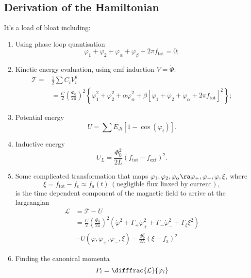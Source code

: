  \subsection{Derivation of the Hamiltonian}
  It's a load of bloat including:
  \begin{enumerate}
  	\item Using phase loop quantisation
  	\begin{equation}\label{key}
  		\varphi_1 + \varphi_2 + \varphi_\alpha + \varphi_\beta + 2\pi f_\text{tot} = 0;
  	\end{equation}
  	\item Kinetic energy evaluation, using emf induction $ V = \dot{\Phi} $:
  	\begin{equation}\label{key}
  		\begin{aligned}
	  		\mathcal{T} = & \frac{1}{2}\sum C_iV_i^2\\
	  		& = \frac{C}{2}\left(\frac{\Phi_0}{2\pi}\right)^2\left\lbrace\dot{\varphi}^2_1 + \dot{\varphi}^2_2 + \alpha\dot{\varphi}^2_\alpha + \beta\left[\dot{\varphi}_1 + \dot{\varphi}_2 + \dot{\varphi}_\alpha + 2\pi \dot{f}_\text{tot}\right]^2\right\rbrace;
  		\end{aligned}
  	\end{equation}
  	\item Potential energy 
  	\begin{equation}\label{key}
  		U = \sum E_{Ji}\left[1 - \cos(\varphi_i)\right].
  	\end{equation}
  	\item Inductive energy
  	\begin{equation}\label{key}
  		U_L = \frac{\Phi_0^2}{2L}\left(f_\text{tot} - f_\text{ext}\right)^2.
  	\end{equation}
  	\item Some complicated transformation that maps $ \varphi_1, \varphi_2, \varphi_\alpha \ra \varphi_+, \varphi_-, \varphi, \xi $, where
  	\begin{equation}\label{key}
  		\xi = f_\text{tot} - f_e \approx f_a(t)\ (\text{negligible flux linxed by current}),
  	\end{equation}
  	\noindent is the time dependent component of the magnetic field to arrive at the largrangian
  	\begin{equation}\label{key}
  		\begin{aligned}
	  		\mathcal{L} & = \mathcal{T} - U\\
	  		& =  \frac{C}{2}\left(\frac{\Phi_0}{2\pi}\right)^2\left(\dot{\varphi}^2 + \Gamma_+\dot{\varphi}_+^2 + \Gamma_-\dot{\varphi}_-^2 + \Gamma_\xi\xi^2\right)\\
	  		& - U(\varphi, \varphi_+, \varphi_-, \xi) - \frac{\Phi_0^2}{2L}\left(\xi - f_\text{a}\right)^2
  		\end{aligned}
  	\end{equation}
  	\item Finding the canonical momenta 
  	\begin{equation}\label{key}
  		P_i = \difffrac{\mathcal{L}}{\varphi_i}
  	\end{equation}
  	

\end{enumerate}
